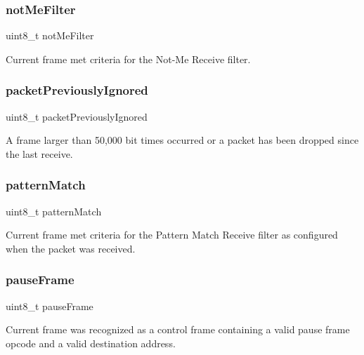 \subsubsection{\texorpdfstring{notMeFilter}{notMeFilter}}
{\footnotesize\ttfamily uint8\+\_\+t not\+Me\+Filter}



Current frame met criteria for the Not-\/\+Me Receive filter. 

\mbox{\label{struct_r_s_v_a91c26b9645e5edca1e4c4f13c76631a2}} 
\subsubsection{\texorpdfstring{packetPreviouslyIgnored}{packetPreviouslyIgnored}}
{\footnotesize\ttfamily uint8\+\_\+t packet\+Previously\+Ignored}



A frame larger than 50,000 bit times occurred or a packet has been dropped since the last receive. 

\mbox{\label{struct_r_s_v_a0b0c5f947dcfec316373912a9d8afad0}} 
\subsubsection{\texorpdfstring{patternMatch}{patternMatch}}
{\footnotesize\ttfamily uint8\+\_\+t pattern\+Match}



Current frame met criteria for the Pattern Match Receive filter as configured when the packet was received. 

\mbox{\label{struct_r_s_v_a1a7098c480755c10613115cc181aa126}} 
\subsubsection{\texorpdfstring{pauseFrame}{pauseFrame}}
{\footnotesize\ttfamily uint8\+\_\+t pause\+Frame}



Current frame was recognized as a control frame containing a valid pause frame opcode and a valid destination address. 

